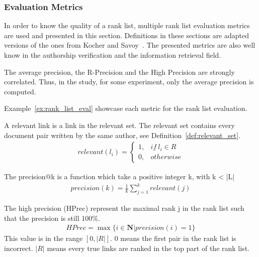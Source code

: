 \subsubsection{Evaluation Metrics \label{sec:rl_eval}}

In order to know the quality of a rank list, multiple rank list evaluation metrics are used and presented in this section.
Definitions in these sections are adapted versions of the ones from Kocher and Savoy~\cite{kocher_linking}.
The presented metrics are also well know in the authorship verification and the information retrieval field.

The average precision, the R-Precision and the High Precision are strongly correlated.
Thus, in the study, for some experiment, only the average precision is computed.

Example~\ref{ex:rank_list_eval} showcase each metric for the rank list evaluation.

\begin{definition}
  A relevant link is a link in the relevant set.
  The relevant set contains every document pair written by the same author, see Definition~\ref{def:relevant_set}.
  \begin{gather*}
    relevant(l_i) =
    \begin{cases}
      1, & if\ l_i \in R \\
      0, & otherwise
    \end{cases}
  \end{gather*}
\end{definition}

\begin{definition}
  The precision@k is a function which take a positive integer k, with k < |L|
  \begin{gather*}
    precision(k) = \frac{1}{k} \sum_{j=1}^{k} relevant(j)
  \end{gather*}
\end{definition}

\begin{definition}
  The high precision (HPrec) represent the maximal rank j in the rank list such that the precision is still 100\%.
  \begin{gather*}
    HPrec = \max\{i \in \mathbf{N} | precision(i) = 1\}
  \end{gather*}
  This value is in the range $\left[0, |R|\right]$.
  $0$ means the first pair in the rank list is incorrect.
  $|R|$ means every true links are ranked in the top part of the rank list.
\end{definition}

